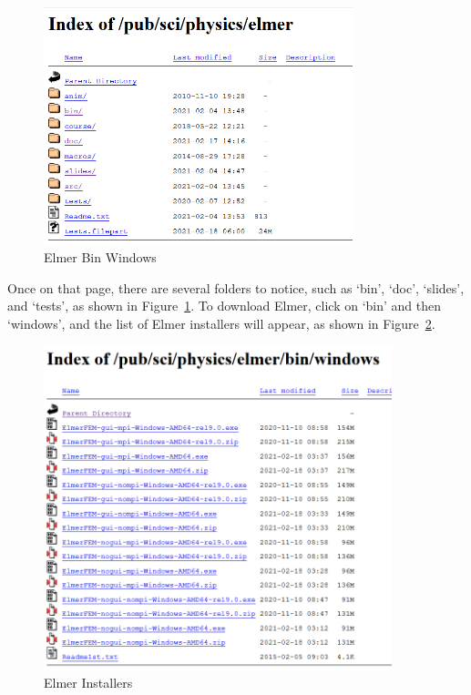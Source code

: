 \begin{figure}[H]
\centering
\includegraphics[width=0.8\textwidth]{elmer}
\caption{Elmer Bin Windows}\label{fg:elmer}
\end{figure}

Once on that page, there are several folders to notice, such as `bin', `doc', `slides', and `tests', as shown in Figure~\ref{fg:elmer}.  To download Elmer, click on `bin' and then `windows', and the list of Elmer installers will appear, as shown in Figure~\ref{fg:elmer-bin-win}.

\begin{figure}[H]
\centering
\includegraphics[width=0.9\textwidth]{elmer-bin-win}
\caption{Elmer Installers}\label{fg:elmer-bin-win}
\end{figure}

